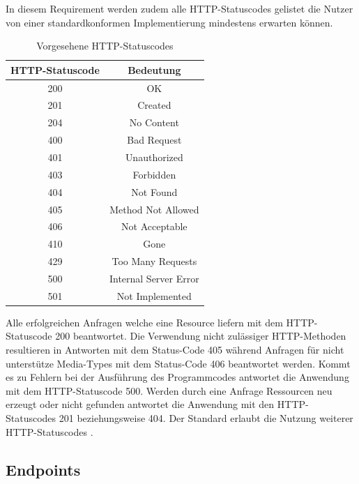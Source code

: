 In diesem Requirement werden zudem alle HTTP-Statuscodes gelistet die Nutzer von einer standardkonformen Implementierung mindestens erwarten können. 
\begin{table}[H]
    \caption{Vorgesehene HTTP-Statuscodes \cite{ogc_api_processes_core}}
    \centering
    \begin{tabular}{c c} 
        HTTP-Statuscode & Bedeutung\\ 
        \hline
        200 & OK\\
        201 & Created\\
        204 & No Content\\
        400 & Bad Request\\
        401 & Unauthorized\\
        403 & Forbidden\\
        404 & Not Found\\
        405 & Method Not Allowed\\
        406 & Not Acceptable\\
        410 & Gone\\
        429 & Too Many Requests\\
        500 & Internal Server Error\\
        501 & Not Implemented\\
    \end{tabular}\label{httpcodes}
\end{table}
Alle erfolgreichen Anfragen welche eine Resource liefern mit dem HTTP-Statuscode 200 beantwortet. Die Verwendung nicht zulässiger HTTP-Methoden resultieren 
in Antworten mit dem Status-Code 405 während Anfragen für nicht unterstütze Media-Types mit dem Status-Code 406 beantwortet werden. Kommt es zu Fehlern bei der Ausführung 
des Programmcodes antwortet die Anwendung mit dem HTTP-Statuscode 500. Werden durch eine Anfrage Ressourcen neu erzeugt oder nicht gefunden antwortet die Anwendung mit 
den HTTP-Statuscodes 201 beziehungsweise 404. Der Standard erlaubt die Nutzung weiterer HTTP-Statuscodes \cite{ogc_api_processes_core}.

\subsection{Endpoints}
